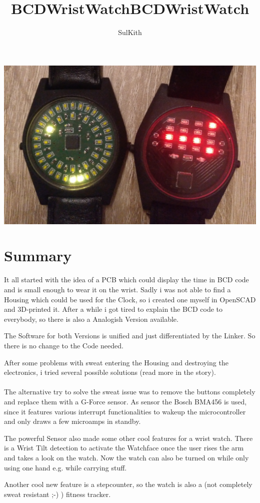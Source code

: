 \documentclass[12pt,a4paper,final]{article}
\title{BCDWristWatch}
\date{\vspace{-10ex}}
\begin{document}
\title{BCDWristWatch}
\author{SulKith}
\maketitle
\vspace{5cm}
\begin{center}
  \includegraphics[width=\textwidth]{../Pictures/AnalogClock.jpg}
\end{center}
\newpage
\section*{Summary}
It all started with the idea of a PCB which could display the time in BCD code and is small enough to wear it on the wrist. Sadly i was not able to find a Housing which could be used for the Clock, so i created one myself in OpenSCAD and 3D-printed it.
After a while i got tired to explain the BCD code to everybody, so there is also a Analogish Version available.

The Software for both Versions is unified and just differentiated by the Linker. So there is no change to the Code needed.

After some problems with sweat entering the Housing and destroying the electronics, i tried several possible solutions (read more in the story).
\\
\\
The alternative try to solve the sweat issue was to remove the buttons completely and replace them with a G-Force sensor. As sensor the Bosch BMA456 is used, since it features various interrupt functionalities to wakeup the microcontroller and only draws a few microamps in standby.

The powerful Sensor also made some other cool features for a wrist watch.
There is a Wrist Tilt detection to activate the Watchface once the user rises the arm and takes a look on the watch. Now the watch can also be turned on while only using one hand e.g. while carrying stuff.

Another cool new feature is a stepcounter, so the watch is also a (not completely sweat resistant ;-) ) fitness tracker.



\end{document}
